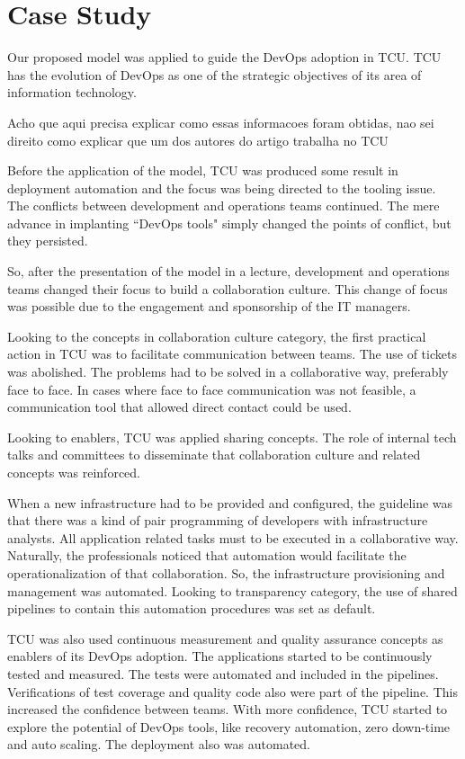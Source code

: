 \section{Case Study} \label{sec:case_study}

Our proposed model was applied to guide the DevOps adoption in TCU. TCU has the
evolution of DevOps as one of the strategic objectives of its area of
information technology.

{\color{red} Acho que aqui precisa explicar como essas informacoes foram
obtidas, nao sei direito como explicar que um dos autores do artigo trabalha no
TCU}

Before the application of the model, TCU was produced some result in deployment
automation and the focus was being directed to the tooling issue. The conflicts
between development and operations teams continued. The mere advance in
implanting ``DevOps tools" simply changed the points of conflict, but they
persisted.

So, after the presentation of the model in a lecture, development and
operations teams changed their focus to build a collaboration culture. This
change of focus was possible due to the engagement and sponsorship of the IT
managers.

Looking to the concepts in collaboration culture category, the first practical
action in TCU was to facilitate communication between teams. The use of tickets
was abolished. The problems had to be solved in a collaborative way, preferably
face to face. In cases where face to face communication was not feasible, a
communication tool that allowed direct contact could be used.

Looking to enablers, TCU was applied sharing concepts. The role of internal
tech talks and committees to disseminate that collaboration culture and related
concepts was reinforced.

When a new infrastructure had to be provided and configured, the guideline was
that there was a kind of pair programming of developers with infrastructure
analysts. All application related tasks must to be executed in a collaborative
way. Naturally, the professionals noticed that automation would facilitate the
operationalization of that collaboration. So, the infrastructure provisioning
and management was automated. Looking to transparency category, the use of
shared pipelines to contain this automation procedures was set as default.

TCU was also used continuous measurement and quality assurance concepts as
enablers of its DevOps adoption. The applications started to be continuously
tested and measured. The tests were automated and included in the pipelines.
Verifications of test coverage and quality code also were part of the pipeline.
This increased the confidence between teams. With more confidence, TCU started
to explore the potential of DevOps tools, like recovery automation, zero
down-time and auto scaling. The deployment also was automated.

